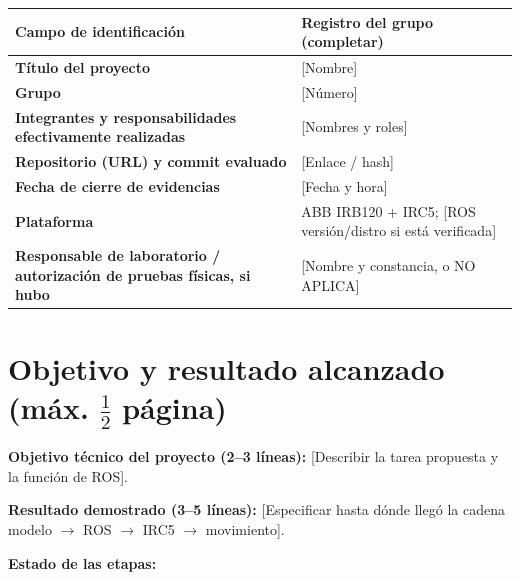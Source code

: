 \documentclass[10pt, a4paper]{article}
\newcommand{\campo}[1]{{\ttfamily\small[#1]}}
\begin{document}
\begingroup
\small
\renewcommand{\arraystretch}{1.35}
\noindent\begin{tabularx}{\textwidth}{|>{\hsize=0.65\hsize\raggedright\arraybackslash}X|>{\hsize=1.35\hsize\raggedright\arraybackslash}X|}
\hline
\rowcolor{ucbblue!15}
\textbf{Campo de identificación} & \textbf{Registro del grupo (completar)} \\ \hline
\textbf{Título del proyecto} & \campo{Nombre} \\ \hline
\textbf{Grupo} & \campo{Número} \\ \hline
\textbf{Integrantes y responsabilidades efectivamente realizadas} & \campo{Nombres y roles} \\ \hline
\textbf{Repositorio (URL) y commit evaluado} & \campo{Enlace / hash} \\ \hline
\textbf{Fecha de cierre de evidencias} & \campo{Fecha y hora} \\ \hline
\textbf{Plataforma} & ABB IRB120 + IRC5; \campo{ROS versión/distro si está verificada} \\ \hline
\textbf{Responsable de laboratorio / autorización de pruebas físicas, si hubo} & \campo{Nombre y constancia, o NO APLICA} \\ \hline
\end{tabularx}
\endgroup

\section{Objetivo y resultado alcanzado \texorpdfstring{{\small\normalfont(máx. $\frac{1}{2}$ página)}}{(máx. 1/2 página)}}

\textbf{Objetivo técnico del proyecto (2--3 líneas):} \campo{Describir la tarea propuesta y la función de ROS}.

\textbf{Resultado demostrado (3--5 líneas):} \campo{Especificar hasta dónde llegó la cadena modelo $\to$ ROS $\to$ IRC5 $\to$ movimiento}.

\textbf{Estado de las etapas:}
\end{document}

